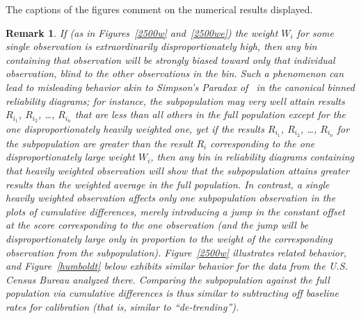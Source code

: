 \documentclass{article}
\newtheorem{remark1}[theorem]{Remark}
\newenvironment{remark}{\begin{remark1} \rm}{\end{remark1}}
\begin{document}
The captions of the figures comment on the numerical results displayed.

\begin{remark}
\label{Simpson}
If (as in Figures~\ref{2500w} and~\ref{2500we}) the weight $W_i$ for some
single observation is extraordinarily disproportionately high, then any bin
containing that observation will be strongly biased toward only that individual
observation, blind to the other observations in the bin. Such a phenomenon
can lead to misleading behavior akin to Simpson's Paradox of~\cite{simpson}
in the canonical binned reliability diagrams; for instance,
the subpopulation may very well
attain results $R_{i_1}$, $R_{i_2}$, \dots, $R_{i_n}$ that are {\it less} than
all others in the full population except for the one disproportionately heavily
weighted one, yet if the results $R_{i_1}$, $R_{i_2}$, \dots, $R_{i_n}$
for the subpopulation are greater than the result $R_i$ corresponding
to the one disproportionately large weight $W_i$, then
any bin in reliability diagrams containing that heavily weighted observation
will show that the subpopulation attains {\it greater} results
than the weighted average in the full population.
In contrast, a single heavily weighted observation affects
only one subpopulation observation in the plots of cumulative differences,
merely introducing a jump in the constant offset
at the score corresponding to the one observation
(and the jump will be disproportionately large only in proportion
to the weight of the corresponding observation from the subpopulation).
Figure~\ref{2500w} illustrates related behavior,
and Figure~\ref{humboldt} below exhibits similar behavior
for the data from the U.S. Census Bureau analyzed there.
Comparing the subpopulation against the full population
via cumulative differences is thus similar to subtracting off baseline rates
for calibration (that is, similar to ``de-trending'').
\end{remark}
\end{document}

